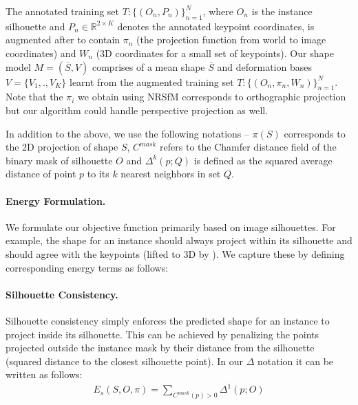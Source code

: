 
The annotated training set $T:\{(O_n, P_n)\}_{n=1}^N$, where $O_n$ is the instance silhouette and $P_n \in \mathbb{R}^{2 \times K}$ denotes the annotated keypoint coordinates, is augmented after \nrsfm to contain $\pi_n$ (the projection function from world to image coordinates) and $W_n$ (3D coordinates for a small set of keypoints).
Our shape model $M = (\overline{S},V)$ comprises of a mean shape $\overline{S}$ and deformation bases $V = \{ V_1,.,V_K \} $ learnt from the augmented training set $T:\{(O_n,\pi_n, W_n)\}_{n=1}^N$. Note that the $\pi_i$ we obtain using NRSfM corresponds to orthographic projection but our algorithm could handle perspective projection as well.

In addition to the above, we use the following notations  --  $\pi(S)$ corresponds to the 2D projection of shape $S$, $C^{mask}$ refers to the Chamfer distance field of the binary mask of silhouette $O$ and $\Delta^k(p;Q)$ is defined as the squared average distance of point $p$ to its $k$ nearest neighbors in set $Q$.

\paragraph{Energy Formulation.} We formulate our objective function primarily based on image silhouettes. For example, the shape for an instance should always project within its silhouette and should agree with the keypoints (lifted to 3D by \nrsfm). We capture these by defining corresponding energy terms as follows:


\paragraph{Silhouette Consistency.} Silhouette consistency simply enforces the predicted shape for an instance to project inside its silhouette. This can be achieved by penalizing the points projected outside the instance mask by their distance from the silhouette (\ie squared distance to the closest silhouette point). In our $\Delta$ notation it can be written as follows:
\begin{gather}
 \label{eq:sil_con}E_{s}(S,O,\pi)=\underset{C^{mask}(p)>0}{\sum}\Delta^1(p;O)
\end{gather}


